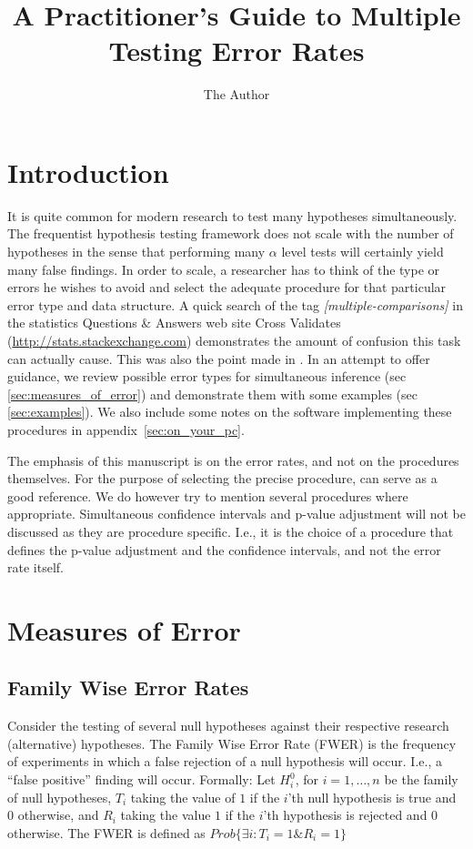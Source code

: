 \documentclass[draft,12pt]{article}
\title{A Practitioner's Guide to Multiple Testing Error Rates}
\author{The Author}
\date{}
\begin{document}
\maketitle


\section{Introduction}

It is quite common for modern research to test many hypotheses simultaneously. The frequentist hypothesis testing framework does not scale with the number of hypotheses in the sense that performing many $\alpha$ level tests will certainly yield many false findings. In order to scale, a researcher has to think of the type or errors he wishes to avoid and select the adequate procedure for that particular error type and data structure. A quick search of the tag \emph{[multiple-comparisons]} in the statistics Questions \& Answers web site Cross Validates (\url{http://stats.stackexchange.com}) demonstrates the amount of confusion this task can actually cause. This was also the point made in \citet[][section 4.4]{benjamini_simultaneous_2010}. 
In an attempt to offer guidance, we review possible error types for simultaneous inference (sec \ref{sec:measures_of_error}) and demonstrate them with some examples (sec \ref{sec:examples}). We also include some notes on the software implementing these procedures in appendix~\ref{sec:on_your_pc}.

The emphasis of this manuscript is on the error rates, and not on the procedures themselves. For the purpose of selecting the precise procedure, \citet{farcomeni_review_2008} can serve as a good reference. We do however try to mention several procedures where appropriate.  Simultaneous confidence intervals and p-value adjustment will not be discussed as they are procedure specific. I.e., it is the choice of a procedure that defines the p-value adjustment and the confidence intervals, and not the error rate itself.


\section{\label{sec:measures_of_error}Measures of Error}

\subsection{Family Wise Error Rates}
Consider the testing of several null hypotheses against their respective research (alternative) hypotheses. The Family Wise Error Rate (FWER) is the frequency of experiments in which a false rejection of a null hypothesis will occur. I.e., a ``false positive'' finding will occur.
Formally: Let $H^0_i$, for $i=1,\ldots,n$ be the family of null hypotheses, $T_i$ taking the value of $1$ if the $i$'th null hypothesis is true and 0 otherwise,  and $R_i$ taking the value $1$ if the $i$'th hypothesis is rejected and 0 otherwise.
The FWER is defined as $Prob\{\exists i:T_i=1 \& R_i=1  \}$
\end{document}
